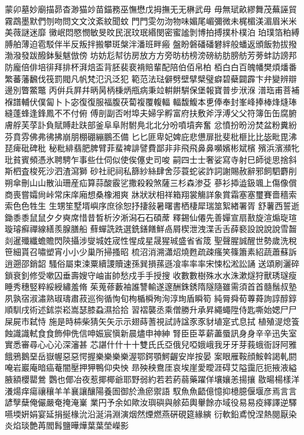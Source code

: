 蒙卯墓妙廟描昴杳渺猫竗苗錨務巫憮懋戊拇撫⽆无楙武⽏
毋無珷畝繆舞茂蕪誣貿霧鵡墨默們刎吻問⽂文汶紊紋聞蚊
⾨門雯勿沕物味媚尾嵋彌微未梶楣渼湄眉⽶米美薇謎迷靡
黴岷悶愍憫敏旻旼民泯玟珉緡閔密蜜謐剝博拍搏撲朴樸泊
珀璞箔粕縛膊舶薄迫雹駁伴半反叛拌搬攀斑槃泮潘班畔瘢
盤盼磐磻磻礬絆般蟠返頒飯勃拔撥渤潑發跋醱鉢髮魃倣傍
坊妨尨幇彷房放⽅方旁昉枋榜滂磅紡肪膀舫芳蒡蚌訪謗邦
防龐倍俳培徘拜排杯湃焙盃背胚裴裵褙賠輩配陪伯佰帛柏
栢⽩白百魄幡樊煩燔番繁蕃藩飜伐筏罰閥凡帆梵氾汎泛犯
範范法琺僻劈壁擘檗璧癖碧蘗闢霹卞弁變辨辯邊別瞥鱉鼈
丙倂兵屛幷昞昺柄棅炳甁病秉竝輧餠騈保堡報寶普步洑湺
潽珤甫菩補褓譜輔伏僕匐⼘卜宓復復服福腹茯蔔複覆輹輻
輻馥鰒本乶俸奉封峯峰捧棒烽熢琫縫蓬蜂逢鋒鳳不不付俯
傅剖副否咐埠夫婦孚孵富府扶敷斧浮溥⽗父符簿⽸缶腐腑
膚艀芙莩訃負賦賻赴趺部釜⾩阜附駙鳧北北分吩噴墳奔奮
忿憤扮昐汾焚盆粉糞紛芬賁雰佛弗彿拂崩朋棚硼繃鵬丕備
⼔匕匪卑妃婢庇悲憊扉批斐枇榧⽐比毖毗毘沸琵痺砒碑秕
秘粃緋翡肥脾臂菲蜚裨誹譬費鄙⾮非⾶飛⿐鼻嚬嬪彬斌檳
殯浜濱瀕牝玭貧賓頻憑氷聘騁乍事些仕伺似使俟僿史司唆
嗣四⼠士奢娑寫寺射巳師徙思捨斜斯柶査梭死沙泗渣瀉獅
砂社祀祠私篩紗絲肆舍莎蓑蛇裟詐詞謝賜赦辭邪飼駟麝削
朔傘刪⼭山散汕珊産疝算蒜酸霰乷撒殺殺煞薩三杉森渗芟
蔘衫揷澁鈒颯上傷像償商喪嘗孀尙峠常床庠廂想桑橡湘爽
牀狀狀相祥箱翔裳觴詳象賞霜塞塞璽賽嗇穡索索⾊色牲⽣
生甥笙墅壻嶼序庶徐恕抒捿敍暑曙書栖棲犀瑞筮絮緖署胥
舒薯西誓逝鋤⿉黍⿏鼠⼣夕奭席惜昔晳析汐淅潟⽯石碩蓆
釋錫仙僊先善嬋宣扇敾旋渲煽琁瑄璇璿癬禪線繕羨腺膳船
蘚蟬詵跣選銑鐥饍鮮卨屑楔泄洩渫⾆舌薛褻設說說說雪齧
剡暹殲纖蟾贍閃陝攝涉燮城姓宬性惺成星晟猩珹盛省省筬
聖聲腥誠醒世勢歲洗稅笹細貰召嘯塑宵⼩小少巢所掃搔昭
梳沼消溯瀟炤燒甦疏疎瘙笑篠簫素紹蔬蕭蘇訴逍遡邵銷韶
騷俗屬束涑粟續謖贖速孫巽損蓀遜飡率率率宋悚松淞訟誦
送頌刷灑碎鎖衰釗修受嗽囚垂壽嫂守岫峀帥愁戍⼿手授搜
收數數樹殊⽔水洙漱燧狩獸琇璲瘦睡秀穗竪粹綏綬繡羞脩
茱蒐蓚藪袖誰讐輸遂邃酬銖銹隋隧隨雖需須⾸首髓鬚叔塾
夙孰宿淑潚熟琡璹肅菽巡徇循恂旬栒楯橓殉洵淳珣盾瞬筍
純脣舜荀蓴蕣詢諄醇錞順馴戌術述鉥崇崧嵩瑟膝蝨濕拾拾
習褶襲丞乘僧勝升承昇繩蠅陞侍匙嘶始媤⼫尸屎屍市弑恃
施是時枾柴猜⽮矢⽰示翅蒔蓍視試詩諡⾗豕豺埴寔式息拭
植殖湜熄篒蝕識識軾⾷食飾伸侁信呻娠宸愼新晨燼申神紳
腎⾂臣莘薪藎蜃訊⾝身⾟辛迅失室實悉審尋⼼心沁深瀋甚
芯諶什什⼗十雙⽒氏亞俄兒啞娥峨我⽛牙芽莪蛾衙訝阿雅
餓鴉鵝堊岳嶽幄惡惡愕握樂樂樂樂渥鄂鍔顎鰐齷安岸按晏
案眼雁鞍顔鮟斡謁軋閼唵岩巖庵暗癌菴闇壓押狎鴨仰央怏
昻殃秧鴦厓哀埃崖愛曖涯碍艾隘靄厄扼掖液縊腋額櫻罌鶯
鸚也倻冶夜惹揶椰爺耶野弱約若若葯蒻藥躍佯壤孃恙揚攘
敭暘楊樣洋瀁煬痒瘍禳穰⽺羊襄讓釀陽養圄御於漁瘀禦語
馭⿂魚齬億憶抑檍臆偃堰彦焉⾔言諺孼蘖俺儼嚴奄掩淹嶪
業円予余如歟汝璵礖與艅茹輿轝餘亦域役易易疫繹譯逆驛
嚥堧姸娟宴延捐挻椽沇沿涎涓淵演烟然煙燃燕硏硯筵緣縯
衍軟鉛鳶悅涅熱閱厭染炎焰琰艶苒閻髥鹽曄燁葉葉塋嶸影
